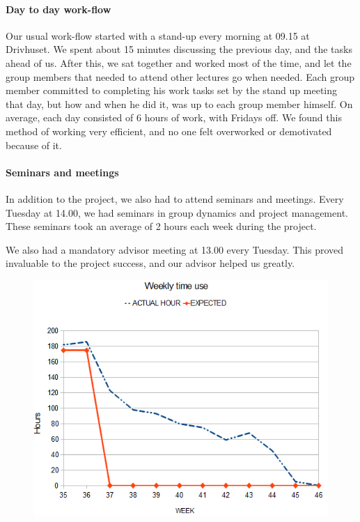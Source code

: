   \paragraph{Day to day work-flow}
  Our usual work-flow started with a stand-up every morning at 09.15 at Drivhuset.
  We spent about 15 minutes discussing the previous day, and the tasks ahead of
  us. After this, we sat together and worked most of the time, and let the group
  members that needed to attend other lectures go when needed. Each group member
  committed to completing his work tasks set by the stand up meeting that day,
  but how and when he did it, was up to each group member himself. On average,
  each day consisted of 6 hours of work, with Fridays off. We found this method
  of working very efficient, and no one felt overworked or demotivated because
  of it.

  \paragraph{Seminars and meetings}
  In addition to the project, we also had to attend seminars and meetings. Every
  Tuesday at 14.00, we had seminars in group dynamics and project management.
  These seminars took an average of 2 hours each week during the project. 

  We also had a mandatory advisor meeting at 13.00 every Tuesday. This proved
  invaluable to the project success, and our advisor helped us greatly. 
 	
    \begin{figure}[htb]
        \centering
        \includegraphics[scale=0.88]{timebudget.png}
        \label{fig:time}
    \end{figure}
